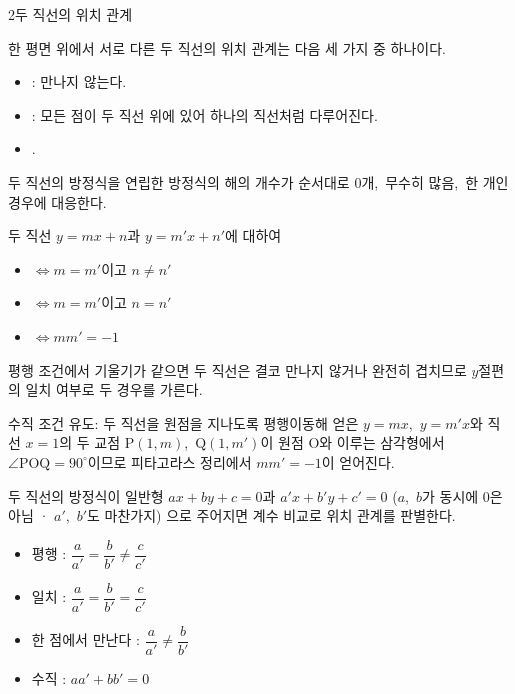 \documentclass[10pt]{article}
\begin{document}
\begin{dmconcept}{2}{두 직선의 위치 관계}
\setlength{\parskip}{0.2mm plus 0.3mm minus 0mm}\linespread{1.04}\selectfont%


한 평면 위에서 서로 다른 두 직선의 위치 관계는 다음 세 가지 중 하나이다.
\begin{itemize}[leftmargin=8mm, itemsep=0.5mm, topsep=1mm]
  \item {} : 만나지 않는다.
  \item {} : 모든 점이 두 직선 위에 있어 하나의 직선처럼 다루어진다.
  \item {}.
\end{itemize}
두 직선의 방정식을 연립한 방정식의 해의 개수가 순서대로 $0$개,\ 무수히 많음,\ 한 개인 경우에 대응한다.


두 직선 $y = mx + n$과 $y = m'x + n'$에 대하여
\begin{itemize}[leftmargin=8mm, itemsep=0.5mm, topsep=1mm]
  \item {} $\Longleftrightarrow m = m'$이고 $n \ne n'$
  \item {} $\Longleftrightarrow m = m'$이고 $n = n'$
  \item {} $\Longleftrightarrow mm' = -1$
\end{itemize}
평행 조건에서 기울기가 같으면 두 직선은 결코 만나지 않거나 완전히 겹치므로 $y$절편의 일치 여부로 두 경우를 가른다.

\begin{dmexplain}
수직 조건 유도: 두 직선을 원점을 지나도록 평행이동해 얻은 $y = mx$,\ $y = m'x$와 직선 $x = 1$의 두 교점 $\mathrm{P}(1, m)$,\ $\mathrm{Q}(1, m')$이 원점 $\mathrm{O}$와 이루는 삼각형에서 $\angle\mathrm{POQ} = 90^\circ$이므로 피타고라스 정리에서 $mm' = -1$이 얻어진다.
\end{dmexplain}


두 직선의 방정식이 일반형 $ax + by + c = 0$과 $a'x + b'y + c' = 0$ ($a$,\ $b$가 동시에 $0$은 아님 · $a'$,\ $b'$도 마찬가지) 으로 주어지면 계수 비교로 위치 관계를 판별한다.
\begin{itemize}[leftmargin=8mm, itemsep=0.5mm, topsep=1mm]
  \item 평행 : $\dfrac{a}{a'} = \dfrac{b}{b'} \ne \dfrac{c}{c'}$
  \item 일치 : $\dfrac{a}{a'} = \dfrac{b}{b'} = \dfrac{c}{c'}$
  \item 한 점에서 만난다 : $\dfrac{a}{a'} \ne \dfrac{b}{b'}$
  \item 수직 : $aa' + bb' = 0$
\end{itemize}


\end{dmconcept}
\end{document}

